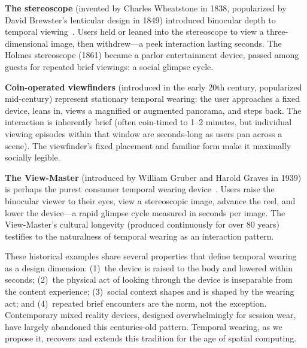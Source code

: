 \textbf{The stereoscope} (invented by Charles Wheatstone in 1838, popularized by David Brewster's lenticular design in 1849) introduced binocular depth to temporal viewing~\cite{wade2002biography}. Users held or leaned into the stereoscope to view a three-dimensional image, then withdrew---a peek interaction lasting seconds. The Holmes stereoscope (1861) became a parlor entertainment device, passed among guests for repeated brief viewings: a social glimpse cycle.

\textbf{Coin-operated viewfinders} (introduced in the early 20th century, popularized mid-century) represent stationary temporal wearing: the user approaches a fixed device, leans in, views a magnified or augmented panorama, and steps back. The interaction is inherently brief (often coin-timed to 1--2 minutes, but individual viewing episodes within that window are seconds-long as users pan across a scene). The viewfinder's fixed placement and familiar form make it maximally socially legible.

\textbf{The View-Master} (introduced by William Gruber and Harold Graves in 1939) is perhaps the purest consumer temporal wearing device~\cite{zone20073d}. Users raise the binocular viewer to their eyes, view a stereoscopic image, advance the reel, and lower the device---a rapid glimpse cycle measured in seconds per image. The View-Master's cultural longevity (produced continuously for over 80 years) testifies to the naturalness of temporal wearing as an interaction pattern.

These historical examples share several properties that define temporal wearing as a design dimension: (1)~the device is raised to the body and lowered within seconds; (2)~the physical act of looking through the device is inseparable from the content experience; (3)~social context shapes and is shaped by the wearing act; and (4)~repeated brief encounters are the norm, not the exception. Contemporary mixed reality devices, designed overwhelmingly for session wear, have largely abandoned this centuries-old pattern. Temporal wearing, as we propose it, recovers and extends this tradition for the age of spatial computing.
